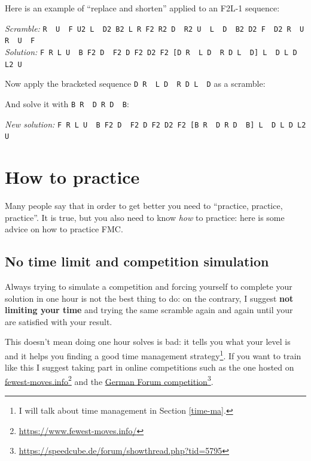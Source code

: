 \documentclass[11pt,a4paper]{book}
\newcommand{\p}{\textquotesingle}
\newcommand{\m}{\texttt}
\newcommand{\ps}{\p\,\,}
\begin{document}
Here is an example of ``replace and shorten'' applied to an F2L-1 sequence:
\begin{center}
\emph{Scramble:} \m{R\ps U\ps F U2 L\ps D2 B2 L R F2 R2 D\ps R2 U\ps L\ps D\ps B2 D2 F\ps D2 R\ps U R\ps U\ps F}\\
\emph{Solution:} \m{F R L U\ps B F2 D\ps F2 D F2 D2 F2 [D R\ps L D\ps R D L\ps D\p] L\ps D L D L2 U}
\end{center}
Now apply the bracketed sequence \m{D R\ps L D\ps R D L\ps D\p} as a scramble:
\begin{center}

\end{center}
And solve it with \m{B R\ps D R D\ps B\p}:
\begin{center}
\emph{New solution:} \m{F R L U\ps B F2 D\ps F2 D F2 D2 F2 [B R\ps D R D\ps B\p] L\ps D L D L2 U}
\end{center}





\chapter{How to practice}

Many people say that in order to get better you need to ``practice, practice, practice''. It is true, but you also need to know \emph{how} to practice: here is some advice on how to practice FMC.

\section{No time limit and competition simulation}

Always trying to simulate a competition and forcing yourself to complete your solution in one hour is not the best thing to do: on the contrary, I suggest \textbf{not limiting your time} and trying the same scramble again and again until your are satisfied with your result.

This doesn't mean doing one hour solves is bad: it tells you what your level is and it helps you finding a good time management strategy\footnote{I will talk about time management in Section \ref{time-ma}.}. If you want to train like this I suggest taking part in online competitions such as the one hosted on \href{https://www.fewest-moves.info/}{fewest-moves.info}\footnote{\url{https://www.fewest-moves.info/}} and the \href{https://speedcube.de/forum/showthread.php?tid=5795}{German Forum competition}\footnote{\url{https://speedcube.de/forum/showthread.php?tid=5795}}.
\end{document}

